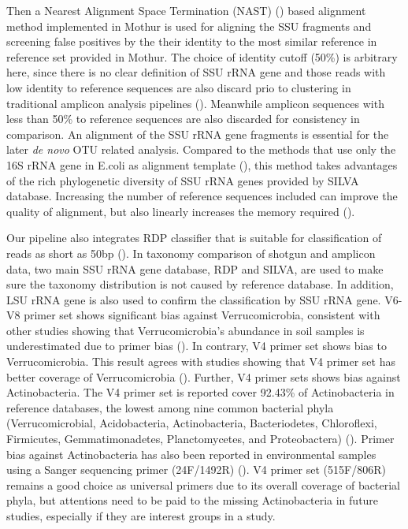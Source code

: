 \documentclass[12pt]{article}
\begin{document}
    Then a Nearest Alignment Space Termination (NAST) (\cite{mothuraligner2009}) based alignment method implemented in Mothur is used for aligning the SSU fragments and screening false positives by the their identity to the most similar reference in reference set provided in Mothur. The choice of identity cutoff (50\%) is arbitrary here, since there is no clear definition of SSU rRNA gene and those reads with low identity to reference sequences are also discard prio to clustering in traditional amplicon analysis pipelines (\cite{rdp2009, mothur, qiime}). Meanwhile amplicon sequences with less than 50\% to reference sequences are also discarded for consistency in comparison. An alignment of the SSU rRNA gene fragments is essential for the later {\em de novo} OTU related analysis. Compared to the methods that use only the 16S rRNA gene in E.coli as alignment template (\cite{kostas2013}), this method takes advantages of the rich phylogenetic diversity of SSU rRNA genes provided by SILVA database. Increasing the number of reference sequences included can improve the quality of alignment, but also linearly increases the memory required (\cite{mothuraligner2009,pynast}).

  Our pipeline also integrates RDP classifier that is suitable for classification of reads as short as 50bp (\cite{rdpclassifier}). In taxonomy comparison of shotgun and amplicon data, two main SSU rRNA gene database, RDP and SILVA, are used to make sure the taxonomy distribution is not caused by reference database. In addition, LSU rRNA gene is also used to confirm the classification by SSU rRNA gene. V6-V8 primer set shows significant bias against Verrucomicrobia, consistent with other studies showing that Verrucomicrobia’s abundance in soil samples is underestimated due to primer bias (\cite{verruco2011}). In contrary, V4 primer set shows bias to Verrucomicrobia. This result agrees with studies showing that V4 primer set has better coverage of Verrucomicrobia (\cite{verruco2011}). Further, V4 primer sets shows bias against Actinobacteria. The V4 primer set is reported cover 92.43\% of Actinobacteria in reference databases, the lowest among nine common bacterial phyla (Verrucomicrobial, Acidobacteria, Actinobacteria, Bacteriodetes, Chloroflexi, Firmicutes, Gemmatimonadetes, Planctomycetes, and Proteobactera) (\cite{verruco2011}). Primer bias against Actinobacteria has also been reported in environmental samples using a Sanger sequencing primer (24F/1492R) (\cite{actinobias}). V4 primer set (515F/806R) remains a good choice as universal primers due to its overall coverage of bacterial phyla, but attentions need to be paid to the missing Actinobacteria in future studies, especially if they are interest groups in a study.
\end{document}

